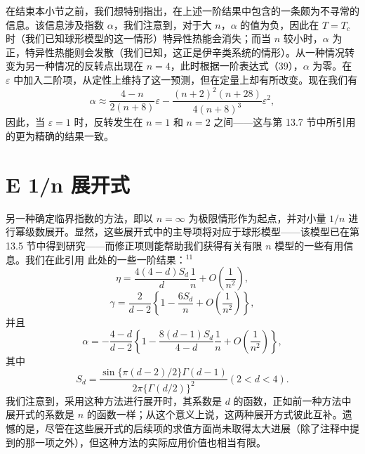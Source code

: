 在结束本小节之前，我们想特别指出，在上述一阶结果中包含的一条颇为不寻常的信息。该信息涉及指数 \(\alpha\)，我们注意到，对于大 \(n\)，\(\alpha\) 的值为负，因此在 \(T=T_{c}\) 时（我们已知球形模型的这一情形）特异性热能会消失；而当 \(n\) 较小时，\(\alpha\) 为正，特异性热能则会发散（我们已知，这正是伊辛类系统的情形）。从一种情况转变为另一种情况的反转点出现在 \(n=4\)，此时根据一阶表达式（39），\(\alpha\) 为零。在 \(\varepsilon\) 中加入二阶项，从定性上维持了这一预测，但在定量上却有所改变。现在我们有
\begin{equation}\tag{14.4.44}\label{eq:14.4.44}
\alpha \approx \frac { 4 - n } { 2 ( n + 8 ) } \varepsilon - \frac { ( n + 2 ) ^{2} ( n + 28 ) } { 4 ( n + 8 ) ^{3} } \varepsilon ^{2} ,
\end{equation}
因此，当 \(\varepsilon=1\) 时，反转发生在 \(n=1\) 和 \(n=2\) 之间——这与第 13.7 节中所引用的更为精确的结果一致。
\section{E 1/n 展开式}\label{e-1n-ux5c55ux5f00ux5f0f}
另一种确定临界指数的方法，即以 \(n=\infty\) 为极限情形作为起点，并对小量 \(1/n\) 进行幂级数展开。显然，这些展开式中的主导项将对应于球形模型——该模型已在第 13.5 节中得到研究——而修正项则能帮助我们获得有关有限 \(n\) 模型的一些有用信息。我们在此引用
此处的一些一阶结果：\(^{11}\)
\begin{equation}\tag{14.4.45}\label{eq:14.4.45}
\eta = \frac { 4 ( 4 - d ) S _ { d } } { d } \frac { 1 } { n } + O \left( \frac { 1 } { n ^{2} } \right) ,
\end{equation}
\begin{equation}\tag{14.4.46}\label{eq:14.4.46}
\gamma = \frac { 2 } { d - 2 } \left\{ 1 - \frac { 6 S _ { d } } { n } + O \left( \frac { 1 } { n ^{2} } \right) \right\} ,
\end{equation}
并且
\begin{equation}\tag{14.4.47}\label{eq:14.4.47}
\alpha = - \frac { 4 - d } { d - 2 } \left\{ 1 - \frac { 8 ( d - 1 ) S _ { d } } { 4 - d } \frac { 1 } { n } + O \left( \frac { 1 } { n ^{2} } \right) \right\} ,
\end{equation}
其中
\begin{equation}\tag{14.4.48}\label{eq:14.4.48}
S _ { d } = \frac { \sin \{ \pi ( d - 2 ) / 2 \} \Gamma ( d - 1 ) } { 2 \pi \{ \Gamma ( d / 2 ) \} ^{2} }  ( 2 < d < 4 ) .
\end{equation}
我们注意到，采用这种方法进行展开时，其系数是 \(d\) 的函数，正如前一种方法中展开式的系数是 \(n\) 的函数一样；从这个意义上说，这两种展开方式彼此互补。遗憾的是，尽管在这些展开式的后续项的求值方面尚未取得太大进展（除了注释中提到的那一项之外），但这种方法的实际应用价值也相当有限。
